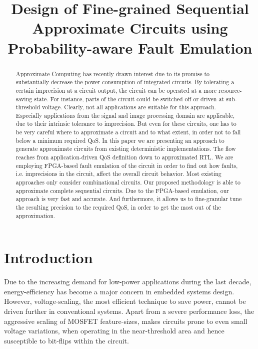 \documentclass[conference]{IEEEtran}
\begin{document}
\title{Design of Fine-grained Sequential Approximate Circuits using Probability-aware Fault Emulation}


\author{
}


\maketitle


\begin{abstract}
Approximate Computing has recently drawn interest due to its promise to substantially decrease the power consumption of integrated circuits. By tolerating a certain imprecision at a circuit output, the circuit can be operated at a more resource-saving state. For instance, parts of the circuit could be switched off or driven at sub-threshold voltage. Clearly, not all applications are suitable for this approach. Especially applications from the signal and image processing domain are applicable, due to their intrinsic tolerance to imprecision. But even for these circuits, one has to be very careful where to approximate a circuit and to what extent, in order not to fall below a minimum required QoS.
In this paper we are presenting an approach to generate approximate circuits from existing deterministic implementations. The flow reaches from application-driven QoS definition down to approximated RTL. We are employing FPGA-based fault emulation of the circuit in order to find out how faults, i.e. imprecisions in the circuit, affect the overall circuit behavior.
Most existing approaches only consider combinational circuits. Our proposed methodology is able to approximate complete sequential circuits. Due to the FPGA-based emulation, our approach is very fast and accurate. And furthermore, it allows us to fine-granular tune the resulting precision to the required QoS, in order to get the most out of the approximation.
\end{abstract}

\IEEEpeerreviewmaketitle



\section{Introduction}
Due to the increasing demand for low-power applications during the last decade, energy-efficiency has become a major concern in embedded systems design. However, voltage-scaling, the most efficient technique to save power, cannot be driven further in conventional systems. Apart from a severe performance loss, the aggressive scaling of \mbox{MOSFET} feature-sizes, makes circuits prone to even small voltage variations, when operating in the near-threshold area and hence susceptible to bit-flips within the circuit.
\end{document}
